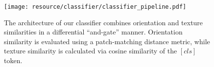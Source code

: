 \begin{figure}[t]
    \centering
    \texttt{[image: resource/classifier/classifier\_pipeline.pdf]} %
    \caption{The architecture of our classifier combines orientation and texture similarities in a differential ``and-gate'' manner. Orientation similarity is evaluated using a patch-matching distance metric, while texture similarity is calculated via cosine similarity of the $[cls]$ token.}
    \label{fig:app_method_classifier}
\end{figure} 
